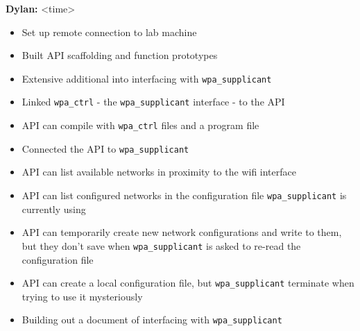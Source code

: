 \documentclass[11pt]{article}
\begin{document}
\textbf{Dylan:} <time>
\begin{itemize}
  \item Set up remote connection to lab machine
  \item Built API scaffolding and function prototypes
  \item Extensive additional into interfacing with \texttt{wpa\_supplicant}
  \item Linked \texttt{wpa\_ctrl} - the \texttt{wpa\_supplicant} interface - to the API
  \item API can compile with \texttt{wpa\_ctrl} files and a program file
  \item Connected the API to \texttt{wpa\_supplicant}
  \item API can list available networks in proximity to the wifi interface
  \item API can list configured networks in the configuration file \texttt{wpa\_supplicant} is currently using
  \item API can temporarily create new network configurations and write to them, but they don't save when 
    \texttt{wpa\_supplicant} is asked to re-read the configuration file
  \item API can create a local configuration file, but \texttt{wpa\_supplicant} terminate when trying to use it mysteriously
  \item Building out a document of interfacing with \texttt{wpa\_supplicant}
\end{itemize}
\end{document}
